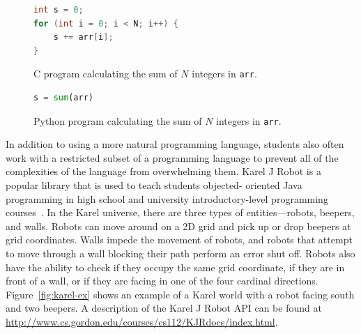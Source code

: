 \documentclass[11pt]{article}
\begin{document}
\begin{figure}[ht]
\begin{lstlisting}[language=C]
int s = 0;
for (int i = 0; i < N; i++) {
    s += arr[i];
}
\end{lstlisting}
\label{fig:c-prog}
\caption{C program calculating the sum of $N$ integers in \texttt{arr}.}
\end{figure}

\begin{figure}[ht]
\begin{lstlisting}[language=python]
s = sum(arr)
\end{lstlisting}
\label{fig:python-prog}
\caption{Python program calculating the sum of $N$ integers in \texttt{arr}.}
\end{figure}

In addition to using a more natural programming language, students also often work with a
restricted subset of a programming language to prevent all of the complexities of the language from
overwhelming them. Karel J Robot is a popular library that is used to teach students objected-
oriented Java programming in high school and university introductory-level programming
courses~\cite{Bergin:2013aa}. In the Karel universe, there are three types of entities---robots,
beepers, and walls. Robots can move around on a 2D grid and pick up or drop beepers at grid
coordinates. Walls impede the movement of robots, and robots that attempt to move through a wall
blocking their path perform an error shut off. Robots also have the ability to check if they occupy
the same grid coordinate, if they are in front of a wall, or if they are facing in one of the four
cardinal directions. Figure~\ref{fig:karel-ex} shows an example of a Karel world with a robot
facing south and two beepers. A description of the Karel J Robot API can be found at
\url{http://www.cs.gordon.edu/courses/cs112/KJRdocs/index.html}.
\end{document}
